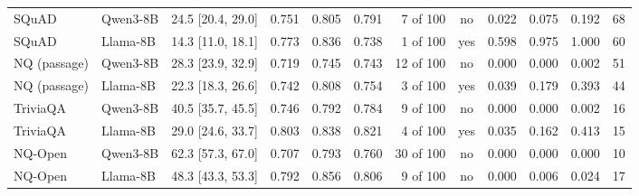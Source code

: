 \begin{table}[!htbp]
\begin{tabular*}{\linewidth}{@{}l@{\hspace{6pt}}l@{\hspace{4pt}\extracolsep{\fill}}lcccrccccc@{}}
SQuAD & Qwen3-8B & 24.5 [20.4, 29.0] & 0.751 & 0.805 & 0.791 & 7 of 100 & no & 0.022 & 0.075 & 0.192 & 68\\
SQuAD & Llama-8B & 14.3 [11.0, 18.1] & 0.773 & 0.836 & 0.738 & 1 of 100 & yes & 0.598 & 0.975 & 1.000 & 60\\
NQ (passage) & Qwen3-8B & 28.3 [23.9, 32.9] & 0.719 & 0.745 & 0.743 & 12 of 100 & no & 0.000 & 0.000 & 0.002 & 51\\
NQ (passage) & Llama-8B & 22.3 [18.3, 26.6] & 0.742 & 0.808 & 0.754 & 3 of 100 & yes & 0.039 & 0.179 & 0.393 & 44\\
TriviaQA & Qwen3-8B & 40.5 [35.7, 45.5] & 0.746 & 0.792 & 0.784 & 9 of 100 & no & 0.000 & 0.000 & 0.002 & 16\\
TriviaQA & Llama-8B & 29.0 [24.6, 33.7] & 0.803 & 0.838 & 0.821 & 4 of 100 & yes & 0.035 & 0.162 & 0.413 & 15\\
NQ-Open & Qwen3-8B & 62.3 [57.3, 67.0] & 0.707 & 0.793 & 0.760 & 30 of 100 & no & 0.000 & 0.000 & 0.000 & 10\\
NQ-Open & Llama-8B & 48.3 [43.3, 53.3] & 0.792 & 0.856 & 0.806 & 9 of 100 & no & 0.000 & 0.006 & 0.024 & 17\\
\bottomrule\end{tabular*}
\end{table}

